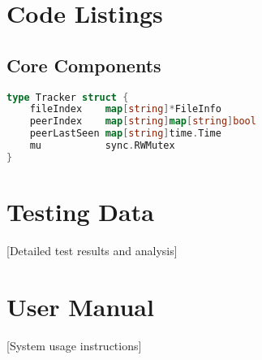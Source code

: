 


\appendix
\chapter{Code Listings}
\section{Core Components}
\begin{lstlisting}[language=Go, caption=Tracker Implementation]
type Tracker struct {
    fileIndex    map[string]*FileInfo
    peerIndex    map[string]map[string]bool
    peerLastSeen map[string]time.Time
    mu           sync.RWMutex
}
\end{lstlisting}

\chapter{Testing Data}
 [Detailed test results and analysis]

\chapter{User Manual}
 [System usage instructions]



